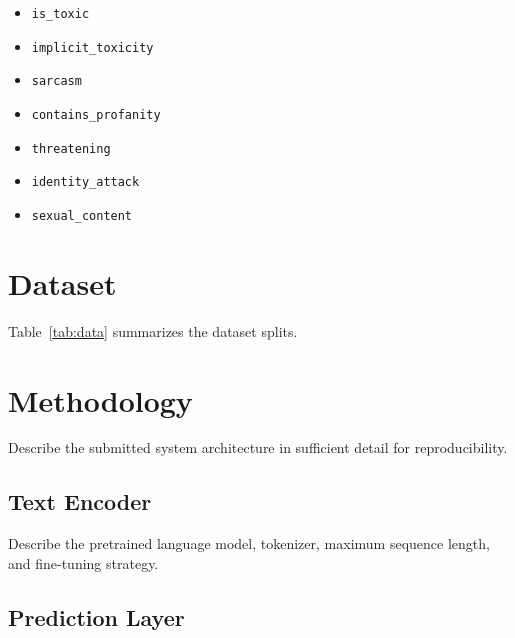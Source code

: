 \documentclass[10pt,a4paper]{article}
\begin{document}
\begin{itemize}

    \item \texttt{is\_toxic}

    \item \texttt{implicit\_toxicity}

    \item \texttt{sarcasm}

    \item \texttt{contains\_profanity}

    \item \texttt{threatening}

    \item \texttt{identity\_attack}

    \item \texttt{sexual\_content}

\end{itemize}



\section{Dataset}

Table~\ref{tab:data} summarizes the dataset splits.





\section{Methodology}

Describe the submitted system architecture in sufficient
detail for reproducibility.


\subsection{Text Encoder}

Describe the pretrained language model, tokenizer,
maximum sequence length, and fine-tuning strategy.


\subsection{Prediction Layer}
\end{document}
